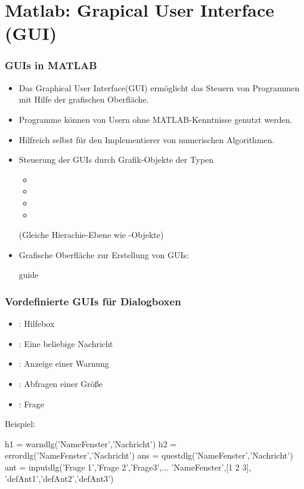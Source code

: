 
%
%
%
%
\section{Matlab: Grapical User Interface (GUI)}
%
%
\begin{frame}[fragile]\frametitle{GUIs in MATLAB}
\begin{itemize}
\item Das Graphical User Interface(GUI) erm\"oglicht das Steuern von Programmen
  mit Hilfe der grafischen Oberfl\"ache. 
\item Programme können von Usern ohne MATLAB-Kenntnisse genutzt werden. 
\item Hilfreich selbst für den Implementierer von numerischen Algorithmen.
\item Steuerung der GUIs durch Grafik-Objekte der Typen
\begin{itemize}
\item {}
\item {} 
\item {}
\item {}
\end{itemize}
(Gleiche Hierachie-Ebene wie -Objekte)
\item Grafische Oberfl\"ache zur Erstellung von GUIs:
\begin{matlabin}
guide
\end{matlabin}
 
\end{itemize}
\end{frame}
%
%
\begin{frame}[fragile]\frametitle{Vordefinierte GUIs f\"ur Dialogboxen}
\begin{itemize}
\item { }: Hilfebox
\item { }: Eine beliebige Nachricht
\item { }: Anzeige einer Warnung
\item { }: Abfragen einer Gr\"o{\ss}e
\item { }: Frage
\end{itemize}
\alert{Beispiel:}
\begin{matlabin}
h1 = warndlg('NameFenster','Nachricht')
h2 = errordlg('NameFenster','Nachricht')
ans = questdlg('NameFenster','Nachricht')
ant = inputdlg({'Frage 1','Frage 2','Frage3'},...
  'NameFenster',[1 2 3], {'defAnt1','defAnt2','defAnt3'})
\end{matlabin}
\end{frame}
